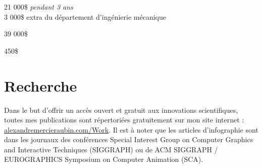 \documentclass[10pt]{article} %
\begin{document}
{
 21 000\$ \textit{pendant 3 ans} \\
 3 000\$ extra du département d'ingénierie mécanique\\
}

{
\textit{} 39 000\$\\
}


{
\textit{} 450\$\\
}

\section{Recherche}
Dans le but d'offrir un accès ouvert et gratuit aux innovations scientifiques, toutes mes publications sont répertoriées gratuitement sur mon site internet : \href{https://alexandremercieraubin.com/Work}{alexandremercieraubin.com/Work}. Il est à noter que les articles d'infographie sont dans les journaux des conférences Special Interest Group on Computer Graphics and Interactive Techniques (SIGGRAPH) ou de ACM SIGGRAPH / EUROGRAPHICS Symposium on Computer Animation (SCA).
\end{document}
